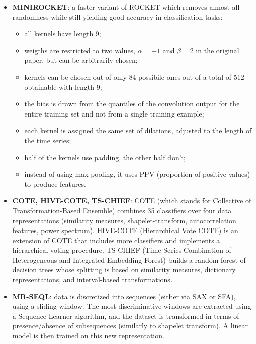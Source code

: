 \begin{itemize}
    \item \textbf{MINIROCKET}: a faster variant of ROCKET which removes almost all randomness while still yielding good accuracy in classification tasks:
    \begin{itemize}
        \item all kernels have length 9; 
        \item weigths are restricted to two values, $\alpha = -1$ and $\beta = 2$ in the original paper, but can be arbitrarily chosen;
        \item kernels can be chosen out of only 84 possibile ones out of a total of 512 obtainable with length 9;
        \item the bias is drawn from the quantiles of the convolution output for the entire training set and not from a single training example;
        \item each kernel is assigned the same set of dilations, adjusted to the length of the time series;
        \item half of the kernels use padding, the other half don't;
        \item instead of using max pooling, it uses PPV (proportion of positive values) to produce features.
    \end{itemize}
    \item \textbf{COTE, HIVE-COTE, TS-CHIEF}: COTE (which stands for Collective of Transformation-Based Ensemble) combines 35 classifiers over four data representations (similarity measures, shapelet-transform, autocorrelation features, power spectrum). HIVE-COTE (Hierarchical Vote COTE) is an extension of COTE that includes more classifiers and implements a hierarchical voting procedure. TS-CHIEF (Time Series Combination of Heterogeneous and Integrated Embedding Forest) builds a random forest of decision trees whose splitting is based on similarity measures, dictionary representations, and interval-based transformations.

    \item \textbf{MR-SEQL}: data is discretized into sequences (either via SAX or SFA), using a sliding window. The most discriminative windows are extracted using a Sequence Learner algorithm, and the dataset is transformed in terms of presence/absence of subsequences (similarly to shapelet transform). A linear model is then trained on this new representation.
\end{itemize}
